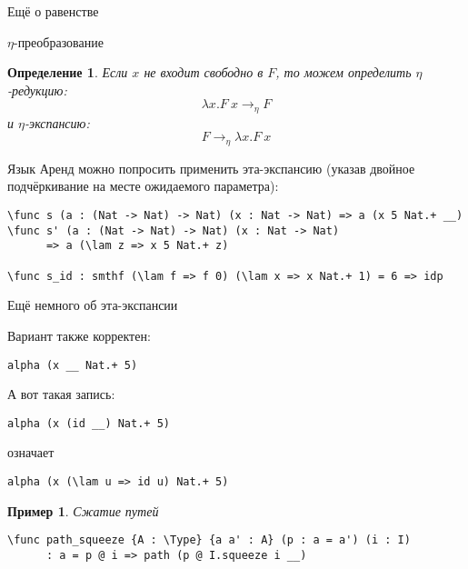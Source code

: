 \documentclass[aspectratio=169,dvipsnames,usenames]{beamer}
\begin{document}
\newtheorem{dfn}{Определение}[section]
\newtheorem{nte}{Замечание}[section]

\newtheorem{axiom}{Аксиома}[section]
\newtheorem{thm}{Теорема}[section]
\newtheorem{lmm}[theorem]{Лемма}
\newtheorem{statement}{Утверждение}[section]
\newtheorem{oun_paragraph}{Пункт}[section]
\newtheorem{cons}{Следствие}[section]
\newtheorem*{exm}{Пример}

\newcommand{\comb}[1]{\operatorname{\mathcal{#1}}}
\newcommand{\func}[1]{\operatorname{#1}}
\newcommand{\reduction}[1]{{\color{OrangeRed}#1}}
\newcommand{\set}[1]{\left\{#1\right\}}

\def\from#1{\par \parbox{0.7\textwidth}{\par \hfill\raggedleft \it #1}} 

\begin{frame}{}
\begin{center}
{\LARGE Ещё о равенстве}
\end{center}
\end{frame}

\begin{frame}[fragile]{$\eta$-преобразование}
\begin{dfn}
Если $x$ не входит свободно в $F$, то можем определить $\eta$-редукцию:
$$\lambda x.F\ x \rightarrow_\eta F$$
и $\eta$-экспансию:
$$F \rightarrow_\eta \lambda x.F\ x$$
\end{dfn}

Язык Аренд можно попросить применить эта-экспансию (указав двойное подчёркивание
на месте ожидаемого параметра):

\begin{verbatim}
\func s (a : (Nat -> Nat) -> Nat) (x : Nat -> Nat) => a (x 5 Nat.+ __)
\func s' (a : (Nat -> Nat) -> Nat) (x : Nat -> Nat) 
      => a (\lam z => x 5 Nat.+ z)

\func s_id : smthf (\lam f => f 0) (\lam x => x Nat.+ 1) = 6 => idp
\end{verbatim}
\end{frame}

\begin{frame}[fragile]{Ещё немного об эта-экспансии}

Вариант также корректен:
\begin{verbatim}
alpha (x __ Nat.+ 5)
\end{verbatim}

А вот такая запись:
\begin{verbatim}
alpha (x (id __) Nat.+ 5)
\end{verbatim}

означает

\begin{verbatim}
alpha (x (\lam u => id u) Nat.+ 5)
\end{verbatim}

\begin{exm}Сжатие путей

\begin{verbatim}
\func path_squeeze {A : \Type} {a a' : A} (p : a = a') (i : I) 
      : a = p @ i => path (p @ I.squeeze i __)
\end{verbatim}
\end{exm}
\end{frame}
\end{document}
